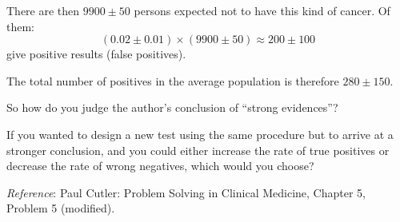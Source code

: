 There are then $9900 \pm 50$ persons expected not to have this kind of cancer. Of them:
\begin{equation}
    (0.02 \pm 0.01) \times (9900 \pm 50) \approx 200 \pm 100
\end{equation}
give positive results (false positives).\myskip

The total number of positives in the average population is therefore $280 \pm 150$.\myskip

So how do you judge the author's conclusion of ``strong evidences''?\myskip

If you wanted to design a new test using the same procedure but to arrive at a stronger conclusion, and you could either increase the rate of true positives or decrease the rate of wrong negatives, which would you choose?\myskip

\noindent\emph{Reference}: Paul Cutler: Problem Solving in Clinical Medicine, Chapter 5, Problem 5 (modified).
